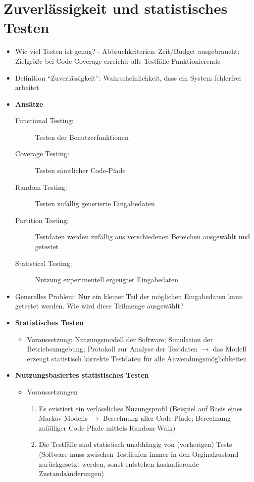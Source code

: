 \section{Zuverlässigkeit und statistisches Testen}
\begin{itemize}
	\item Wie viel Testen ist genug? - Abbruchkriterien: Zeit/Budget ausgebraucht; Zielgröße bei Code-Coverage erreicht; alle Testfälle Funktionierende
	\item Definition "`Zuverlässigkeit"': Wahrscheinlichkeit, dass ein System fehlerfrei arbeitet
	\item \textbf{Ansätze}
	\begin{description}
		\item[Functional Testing:] Testen der Benutzerfunktionen
		\item[Coverage Testing:] Testen sämtlicher Code-Pfade
		\item[Random Testing:] Testen zufällig generierte Eingabedaten
		\item[Partition Testing:] Testdaten werden zufällig aus verschiedenen Bereichen ausgewählt und getestet
		\item[Statistical Testing:] Nutzung experimentell ergeugter Eingabedaten
	\end{description}
	\item Generelles Problem: Nur ein kleiner Teil der möglichen Eingabedaten kann getestet werden. Wie wird diese Teilmenge ausgewählt?
	\item \textbf{Statistisches Testen}
	\begin{itemize}
		\item Voraussetzung: Nutzungsmodell der Software; Simulation der Betriebsumgebung; Protokoll zur Analyse der Testdaten \(\rightarrow\) das Modell erzeugt statistisch korrekte Testdaten für alle Anwendungsmöglichkeiten
	\end{itemize}
	\item \textbf{Nutzungsbasiertes statistisches Testen}
	\begin{itemize}
		\item Voraussetzungen
		\begin{enumerate}
			\item Es existiert ein verlässliches Nuzungsprofil (Beispiel auf Basis eines Markov-Modells \(\rightarrow\) Berechnung aller Code-Pfade; Berechnung zufälliger Code-Pfade mittels Random-Walk)
			\item Die Testfälle sind statistisch unabhängig von (vorherigen) Tests (Software muss zwischen Testläufen immer in den Orginalzustand zurückgesetzt werden, sonst entstehen kaskadierende Zustandsänderungen)

\end{enumerate}
\end{itemize}
\end{itemize}
